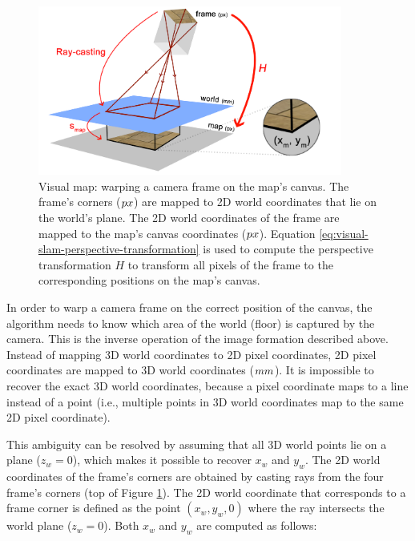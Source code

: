 \begin{figure}[htb]
\centering
\includegraphics[width=10cm]{images/mapping1.png}
\caption{Visual map: warping a camera frame on the map's canvas. The frame's corners ($\small{px}$) are mapped to 2D world coordinates that lie on the world's plane. The 2D world coordinates of the frame are mapped to the map's canvas coordinates ($\small{px}$). Equation \ref{eq:visual-slam-perspective-transformation} is used to compute the perspective transformation $H$ to transform all pixels of the frame to the corresponding positions on the map's canvas.}
\label{fig:mapping2}
\end{figure}

In order to warp a camera frame on the correct position of the canvas, the algorithm needs to know which area of the world (floor) is captured by the camera.
This is the inverse operation of the image formation described above.
Instead of mapping 3D world coordinates to 2D pixel coordinates, 2D pixel coordinates are mapped to 3D world coordinates ($\small{mm}$).
It is impossible to recover the exact 3D world coordinates, because a pixel coordinate maps to a line instead of a point (i.e., multiple points in 3D world coordinates map to the same 2D pixel coordinate).

This ambiguity can be resolved by assuming that all 3D world points lie on a plane ($z_w = 0$), which makes it possible to recover $x_w$ and $y_w$.
The 2D world coordinates of the frame's corners are obtained by casting rays from the four frame's corners (top of Figure \ref{fig:mapping2}).
The 2D world coordinate that corresponds to a frame corner is defined as the point $(x_w,  y_w , 0)$ where the ray intersects the world plane ($z_w = 0$).
Both $x_w$ and $y_w$ are computed as follows:

